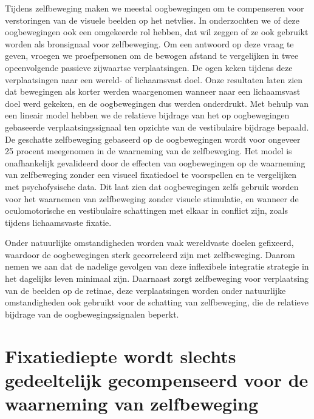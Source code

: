 Tijdens zelfbeweging maken we meestal oogbewegingen om te compenseren voor verstoringen van de visuele beelden op het netvlies. In  onderzochten we of deze oogbewegingen ook een omgekeerde rol hebben, dat wil zeggen of ze ook gebruikt worden als bronsignaal voor zelfbeweging. Om een antwoord op deze vraag te geven, vroegen we proefpersonen om de bewogen afstand te vergelijken in twee opeenvolgende passieve zijwaartse verplaatsingen. De ogen keken tijdens deze verplaatsingen naar een wereld- of lichaamsvast doel. Onze resultaten laten zien dat bewegingen als korter werden waargenomen wanneer naar een lichaamsvast doel werd gekeken, en de oogbewegingen dus werden onderdrukt. Met behulp van een lineair model hebben we de relatieve bijdrage van het op oogbewegingen gebaseerde verplaatsingssignaal ten opzichte van de vestibulaire bijdrage bepaald. De geschatte zelfbeweging gebaseerd op de oogbewegingen wordt voor ongeveer 25 procent meegenomen in de waarneming van de zelfbeweging. Het model is onafhankelijk gevalideerd door de effecten van oogbewegingen op de waarneming van zelfbeweging zonder een visueel fixatiedoel te voorspellen en te vergelijken met psychofysische data. Dit laat zien dat oogbewegingen zelfs gebruik worden voor het waarnemen van zelfbeweging zonder visuele stimulatie, en wanneer de oculomotorische en vestibulaire schattingen met elkaar in conflict zijn, zoals tijdens lichaamsvaste fixatie.

Onder natuurlijke omstandigheden worden vaak wereldvaste doelen gefixeerd, waardoor  de oogbewegingen sterk gecorreleerd zijn met zelfbeweging. Daarom nemen we aan dat de nadelige gevolgen van deze inflexibele integratie strategie in het dagelijks leven minimaal zijn. Daarnaast zorgt zelfbeweging voor verplaatsing van de beelden op de retinae, deze verplaatsingen worden onder natuurlijke omstandigheden ook gebruikt voor de schatting van zelfbeweging, die de relatieve bijdrage van de oogbewegingssignalen beperkt.


\section{Fixatiediepte wordt slechts gedeeltelijk gecompenseerd voor de waarneming van zelfbeweging}

